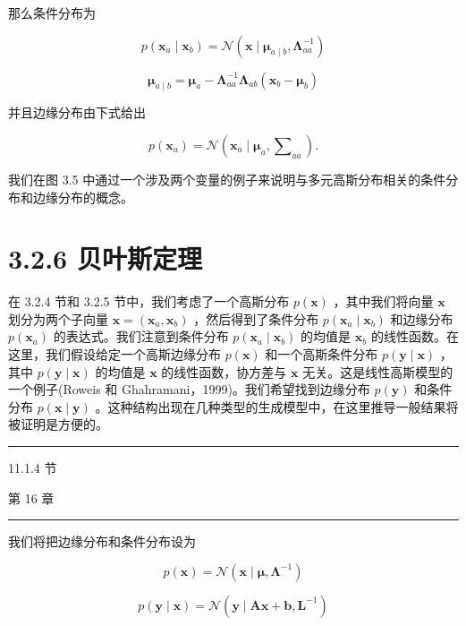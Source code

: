 \documentclass[10pt]{article}
\newcommand{\HRule}{\begin{center}\rule{0.9\linewidth}{0.2mm}\end{center}}
\begin{document}
那么条件分布为

\[
p\left( {{\mathbf{x}}_{a} \mid  {\mathbf{x}}_{b}}\right)  = \mathcal{N}\left( {\mathbf{x} \mid  {\mathbf{\mu }}_{a \mid  b},{\mathbf{\Lambda }}_{aa}^{-1}}\right)  \tag{3.80}
\]

\[
{\mathbf{\mu }}_{a \mid  b} = {\mathbf{\mu }}_{a} - {\mathbf{\Lambda }}_{aa}^{-1}{\mathbf{\Lambda }}_{ab}\left( {{\mathbf{x}}_{b} - {\mathbf{\mu }}_{b}}\right)  \tag{3.81}
\]

并且边缘分布由下式给出

\[
p\left( {\mathbf{x}}_{a}\right)  = \mathcal{N}\left( {{\mathbf{x}}_{a} \mid  {\mathbf{\mu }}_{a},{\mathbf{\sum }}_{aa}}\right) . \tag{3.82}
\]

我们在图 3.5 中通过一个涉及两个变量的例子来说明与多元高斯分布相关的条件分布和边缘分布的概念。

\section*{3.2.6 贝叶斯定理}

在 3.2.4 节和 3.2.5 节中，我们考虑了一个高斯分布 \(p\left( \mathbf{x}\right)\) ，其中我们将向量 \(\mathbf{x}\) 划分为两个子向量 \(\mathbf{x} = \left( {{\mathbf{x}}_{a},{\mathbf{x}}_{b}}\right)\) ，然后得到了条件分布 \(p\left( {{\mathbf{x}}_{a} \mid  {\mathbf{x}}_{b}}\right)\) 和边缘分布 \(p\left( {\mathbf{x}}_{a}\right)\) 的表达式。我们注意到条件分布 \(p\left( {{\mathbf{x}}_{a} \mid  {\mathbf{x}}_{b}}\right)\) 的均值是 \({\mathbf{x}}_{b}\) 的线性函数。在这里，我们假设给定一个高斯边缘分布 \(p\left( \mathbf{x}\right)\) 和一个高斯条件分布 \(p\left( {\mathbf{y} \mid  \mathbf{x}}\right)\) ，其中 \(p\left( {\mathbf{y} \mid  \mathbf{x}}\right)\) 的均值是 \(\mathbf{x}\) 的线性函数，协方差与 \(\mathbf{x}\) 无关。这是线性高斯模型的一个例子(Roweis 和 Ghahramani，1999)。我们希望找到边缘分布 \(p\left( \mathbf{y}\right)\) 和条件分布 \(p\left( {\mathbf{x} \mid  \mathbf{y}}\right)\) 。这种结构出现在几种类型的生成模型中，在这里推导一般结果将被证明是方便的。

\HRule

11.1.4 节

第 16 章

\HRule

我们将把边缘分布和条件分布设为

\[
p\left( \mathbf{x}\right)  = \mathcal{N}\left( {\mathbf{x} \mid  \mathbf{\mu },{\mathbf{\Lambda }}^{-1}}\right)  \tag{3.83}
\]

\[
p\left( {\mathbf{y} \mid  \mathbf{x}}\right)  = \mathcal{N}\left( {\mathbf{y} \mid  \mathbf{A}\mathbf{x} + \mathbf{b},{\mathbf{L}}^{-1}}\right)  \tag{3.84}
\]
\end{document}
